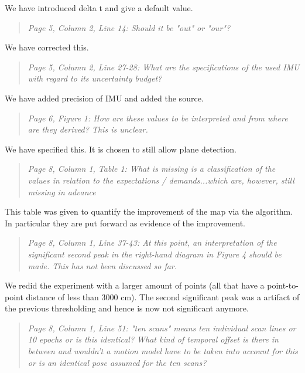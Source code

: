\documentclass{article}
\newenvironment{itquote}
  {\begin{quote}\itshape}
  {\end{quote}\ignorespacesafterend}
\begin{document}
We have introduced delta t and give a default value.

\begin{itquote}
Page 5, Column 2, Line 14: Should it be "out" or "our"?
\end{itquote}

We have corrected this.

\begin{itquote}
Page 5, Column 2, Line 27-28: What are the specifications of the
used IMU with regard to its uncertainty budget?
\end{itquote}

We have added precision of IMU and added the source.

\begin{itquote}
Page 6, Figure 1: How are these values to be interpreted and from
where are they derived? This is unclear.
\end{itquote}

We have specified this. It is chosen to still allow plane detection.

\begin{itquote}
Page 8, Column 1, Table 1: What is missing is a classification of
the values in relation to the expectations / demands...which are,
however, still missing in advance
\end{itquote}

This table was given to quantify the improvement of the map via the algorithm.
In particular they are put forward as evidence of the improvement.  

\begin{itquote}
Page 8, Column 1, Line 37-43: At this point, an interpretation of
the significant second peak in the right-hand diagram in Figure 4
should be made. This has not been discussed so far.
\end{itquote}

We redid the experiment with a larger amount of points (all that have
a point-to-point distance of less than 3000 cm). The second significant
peak was a artifact of the previous thresholding and hence is now not 
significant anymore. 

\begin{itquote}
Page 8, Column 1, Line 51: "ten scans" means ten individual scan
lines or 10 epochs or is this identical? What kind of temporal
offset is there in between and wouldn't a motion model have to be
taken into account for this or is an identical pose assumed for the
ten scans?
\end{itquote}
\end{document}
